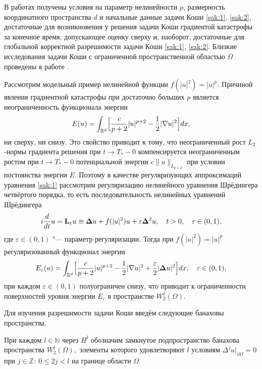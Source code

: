\smallskip

В работах \cite{Zhidkov,  Glassey, GV} получены условия на параметр нелинейности $p$, размерность координатного пространства $d$ и начальные данные задачи Коши \eqref{sak:1}, \eqref{sak:2}, достаточные для возникновения у решения задачи Коши градиентой катастрофы за конечное время, допускающее оценку сверху и, наоборот, достаточные для глобальной корректной разрешимости задачи Коши \eqref{sak:1}, \eqref{sak:2}. Близкие исследования задачи Коши с ограниченной пространственной областью $\Omega $ проведены в работе \cite{Kavi}.

Рассмотрим модельный пример нелинейной функции $f(|u|^2)=|u|^{p}$.
Причиной явления градиентной катастрофы при достаточно больших $p$ является неограниченность функционала энергии
\begin{equation}
E(u)=\int_{\mathbb R^{d}}\Bigl[{c\over {p+2}}|u|^{p+2}-{1\over 2}|\nabla u|^{2}\Bigr]dx,
\label{sak:3}
\end{equation}
ни сверху, ни снизу. Это свойство
приводит к тому, что неограниченный рост $L_{2}$-нормы градиента решения при $t\to T_{*}-0$ компенсируется неограниченным ростом
при $t\to T_{*}-0$ потенциальной энергии $c\|u\|_{L_{p+2}}$ при условии постоянства энергии $E$. Поэтому в качестве регуляризующих
аппроксимаций уравнения \eqref{sak:1} рассмотрим регуляризацию нелинейного уравнения
Шрёдингера четвёртого порядка, то есть последовательность
нелинейных уравнений Шрёдингера
\begin{equation}
i{d\over {dt}}u={\bf L}_{\varepsilon }u\equiv {\bf \Delta }u+f(|u|^2)u+\varepsilon 
{\bf \Delta }^{2}u,\quad  t>0,\quad \varepsilon  \in (0, 1),
\label{sak:4}
\end{equation}
где $\varepsilon  \in (0, 1)$ "--- параметр регуляризации. Тогда при $f(|u|^2)=|u|^{p}$
регуляризованный функционал энергии
$$
E_{\varepsilon  }(u)=\int_{\mathbb R^{d}}\Bigl[{c\over {p+2}}|u|^{p+2}-{1\over 2 }|\nabla u|^{2}+{{\varepsilon }\over 2}|{\bf \Delta }u|^{2}\Bigr]dx,\quad  \varepsilon  \in (0, 1),
$$
при каждом $\varepsilon  \in (0,1)$ полуограничен снизу, что
приводит к ограниченности поверхностей уровня энергии $E_{\varepsilon }$ в пространстве $W^1_2(\Omega )$. 

\smallskip

Для изучения разрешимости задачи Коши введём следующие банаховы
пространства. 

При каждом $l\in \mathbb N$ через $H^{l}$ обозначим замкнутое подпространство банахова пространства
$W_{2}^{l}(\Omega),$ элементы которого удовлетворяют $l$
условиям $\Delta ^{j}u|_{\partial  \Omega }=0$ при $j\in {\mathbb Z}:\ 0\leq 2j<l$ на границе области $\Omega .$

